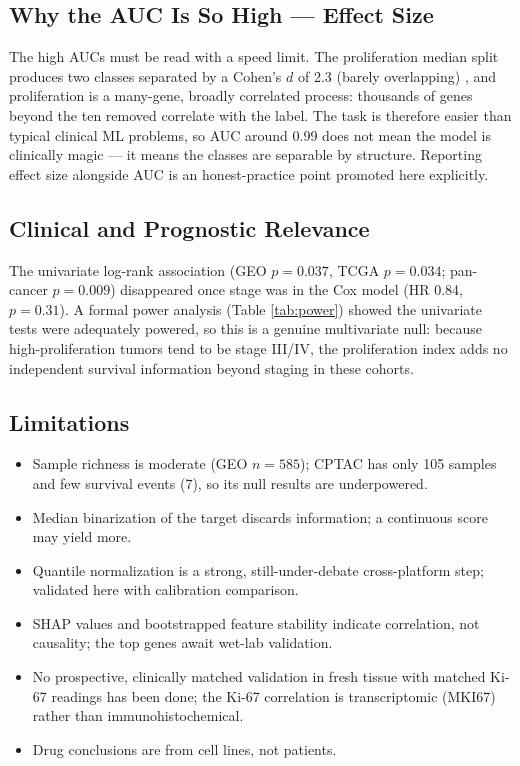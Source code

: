 \documentclass[12pt]{article}
\begin{document}
\subsection{Why the AUC Is So High --- Effect Size}
The high AUCs must be read with a speed limit. The proliferation median split produces two classes separated by a Cohen's $d$ of 2.3 (barely overlapping) \citep{cohen1988}, and proliferation is a many-gene, broadly correlated process: thousands of genes beyond the ten removed correlate with the label. The task is therefore easier than typical clinical ML problems, so AUC around 0.99 does not mean the model is clinically magic --- it means the classes are separable by structure. Reporting effect size alongside AUC is an honest-practice point promoted here explicitly.

\subsection{Clinical and Prognostic Relevance}
The univariate log-rank association (GEO $p = 0.037$, TCGA $p = 0.034$; pan-cancer $p = 0.009$) disappeared once stage was in the Cox model (HR 0.84, $p = 0.31$). A formal power analysis (Table \ref{tab:power}) showed the univariate tests were adequately powered, so this is a genuine multivariate null: because high-proliferation tumors tend to be stage III/IV, the proliferation index adds no independent survival information beyond staging in these cohorts.

\subsection{Limitations}
\begin{itemize}
    \item Sample richness is moderate (GEO $n = 585$); CPTAC has only 105 samples and few survival events (7), so its null results are underpowered.
    \item Median binarization of the target discards information; a continuous score may yield more.
    \item Quantile normalization is a strong, still-under-debate cross-platform step; validated here with calibration comparison.
    \item SHAP values and bootstrapped feature stability indicate correlation, not causality; the top genes await wet-lab validation.
    \item No prospective, clinically matched validation in fresh tissue with matched Ki-67 readings has been done; the Ki-67 correlation is transcriptomic (MKI67) rather than immunohistochemical.
    \item Drug conclusions are from cell lines, not patients.
\end{itemize}
\end{document}
